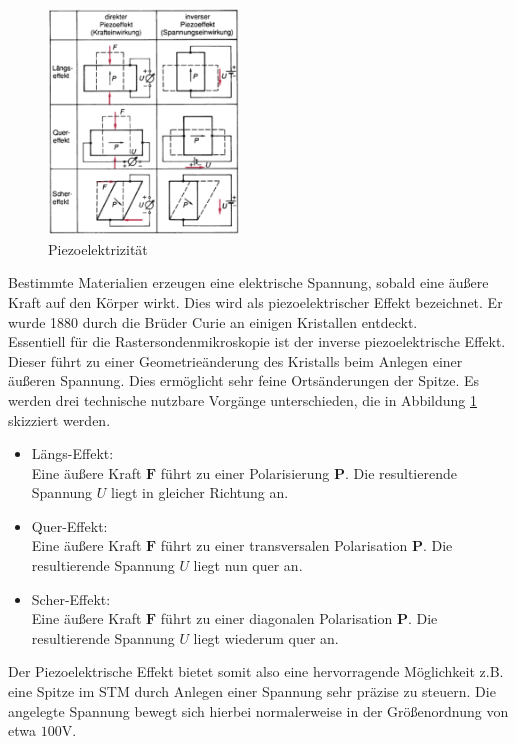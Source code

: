 \begin{figure}
	\includegraphics[width=0.45\textwidth]{Abb/piezo.png}
	\caption{Piezoelektrizität \cite{phying}}
	\label{piezo}
\end{figure}
Bestimmte Materialien erzeugen eine elektrische Spannung, sobald eine äußere Kraft
auf den Körper wirkt. Dies wird als piezoelektrischer Effekt bezeichnet. Er wurde
1880 durch die Brüder Curie an einigen Kristallen entdeckt.\\
Essentiell für die Rastersondenmikroskopie ist der inverse piezoelektrische Effekt.
Dieser führt zu einer Geometrieänderung des Kristalls beim Anlegen einer äußeren 
Spannung. Dies ermöglicht sehr feine Ortsänderungen der Spitze. Es werden drei 
technische nutzbare Vorgänge unterschieden, die in Abbildung \ref{piezo} skizziert
werden.
\begin{itemize}
	\item Längs-Effekt:\\
	Eine äußere Kraft $\textbf{F}$ führt zu einer Polarisierung $\textbf{P}$.
	Die resultierende Spannung $U$ liegt in gleicher Richtung an.
	\item Quer-Effekt:\\
	Eine äußere Kraft $\textbf{F}$ führt zu einer transversalen Polarisation
	$\textbf{P}$. Die resultierende Spannung $U$ liegt nun quer an.
	\item Scher-Effekt:\\
	Eine äußere Kraft $\textbf{F}$ führt zu einer diagonalen Polarisation
	$\textbf{P}$. Die resultierende Spannung $U$ liegt wiederum quer an.
\end{itemize} 
Der Piezoelektrische Effekt bietet somit also eine hervorragende Möglichkeit z.B. eine Spitze im STM durch Anlegen einer Spannung sehr präzise zu steuern. Die angelegte Spannung bewegt sich hierbei normalerweise in der Größenordnung von etwa $100\si{\volt}$.
\cite{phying} 

